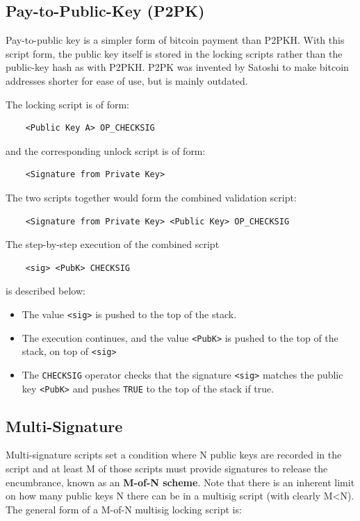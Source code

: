 \documentclass{article}
\begin{document}
  \subsection{Pay-to-Public-Key (P2PK)}

    Pay-to-public key is a simpler form of bitcoin payment than P2PKH. With this script form, the public key itself is stored in the locking scripts rather than the public-key hash as with P2PKH. P2PK was invented by Satoshi to make bitcoin addresses shorter for ease of use, but is mainly outdated.

    The locking script is of form:
    \begin{lstlisting}
    <Public Key A> OP_CHECKSIG
    \end{lstlisting}

    and the corresponding unlock script is of form:
    \begin{lstlisting}
    <Signature from Private Key>
    \end{lstlisting}

    The two scripts together would form the combined validation script:
    \begin{lstlisting}
    <Signature from Private Key> <Public Key> OP_CHECKSIG
    \end{lstlisting}

    The step-by-step execution of the combined script
    \begin{lstlisting}
    <sig> <PubK> CHECKSIG
    \end{lstlisting}
    is described below:

    \begin{itemize}
      \item The value \texttt{<sig>} is pushed to the top of the stack.
      \item The execution continues, and the value \texttt{<PubK>} is pushed to the top of the stack, on top of \texttt{<sig>}
      \item The \texttt{CHECKSIG} operator checks that the signature \texttt{<sig>} matches the public key \texttt{<PubK>} and pushes \texttt{TRUE} to the top of the stack if true.
    \end{itemize}

  \subsection{Multi-Signature}

    Multi-signature scripts set a condition where N public keys are recorded in the script and at least M of those scripts must provide signatures to release the encumbrance, known as an \textbf{M-of-N scheme}. Note that there is an inherent limit on how many public keys N there can be in a multisig script (with clearly M<N). The general form of a M-of-N multisig locking script is:
\end{document}
